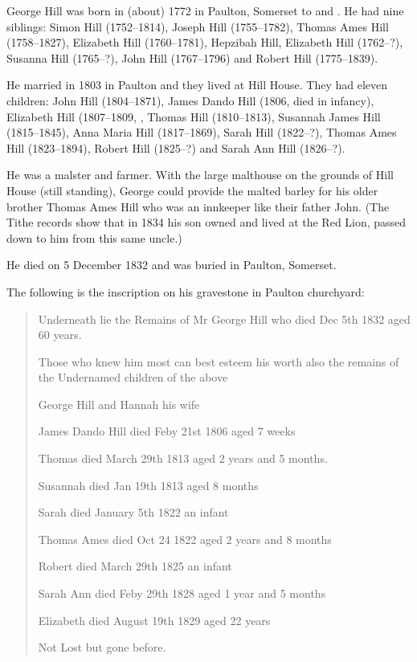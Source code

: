 
George Hill was born in (about) 1772 in	Paulton, Somerset to  and .
He had nine siblings: Simon Hill (1752--1814), Joseph Hill (1755--1782), Thomas Ames Hill (1758--1827), Elizabeth Hill (1760--1781), Hepzibah Hill, Elizabeth Hill (1762--?), Susanna Hill (1765--?), John Hill (1767--1796) and Robert Hill (1775--1839).

He married  in 1803 in Paulton and they lived at Hill House. They had eleven children:
John Hill (1804--1871), James Dando Hill (1806, died in infancy), Elizabeth Hill (1807--1809, ,
Thomas Hill (1810--1813), Susannah James Hill (1815--1845), Anna Maria Hill (1817--1869), Sarah Hill (1822--?),
Thomas Ames Hill (1823--1894), Robert Hill (1825--?) and Sarah Ann Hill (1826--?).

He was a malster and farmer. With the large malthouse on the grounds of Hill House (still standing), George could provide the malted barley for his older brother Thomas Ames Hill who was an innkeeper like their father John. (The Tithe records show that in 1834 his son owned and lived at the Red Lion, passed down to him from this same uncle.)

He died on 5 December 1832 and was buried in Paulton, Somerset.

The following is the inscription on his gravestone in Paulton churchyard:

\begin{quotation}
Underneath lie the Remains of Mr George Hill who died Dec 5th 1832 aged 60 years.

Those who knew him most can best esteem his worth also the remains of the Undernamed children of the above

George Hill and Hannah his wife

James Dando Hill died Feby 21st 1806 aged 7 weeks

Thomas died March 29th 1813 aged 2 years and 5 months.

Susannah died Jan 19th 1813 aged 8 months

Sarah died January 5th 1822 an infant

Thomas Ames died Oct 24 1822 aged 2 years and 8 months

Robert died March 29th 1825 an infant

Sarah Ann died Feby 29th 1828 aged 1 year and 5 months

Elizabeth died August 19th 1829 aged 22 years

Not Lost but gone before.
\end{quotation}

